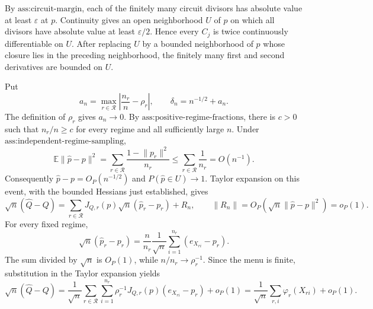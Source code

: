 By \(\text{ass:circuit-margin}\), each of the finitely many circuit divisors has absolute value at least \(\varepsilon\) at \(p\).  Continuity gives an open neighborhood \(U\) of \(p\) on which all divisors have absolute value at least \(\varepsilon/2\).  Hence every \(C_j\) is twice continuously differentiable on \(U\).  After replacing \(U\) by a bounded neighborhood of \(p\) whose closure lies in the preceding neighborhood, the finitely many first and second derivatives are bounded on \(U\).

Put
\[
 a_n=\max_{r\in\mathcal R}\left|\frac{n_r}{n}-\rho_r\right|,
 \qquad \delta_n=n^{-1/2}+a_n.
\]
The definition of \(\rho_r\) gives \(a_n\to0\).  By \(\text{ass:positive-regime-fractions}\), there is \(c>0\) such that \(n_r/n\ge c\) for every regime and all sufficiently large \(n\).  Under \(\text{ass:independent-regime-sampling}\),
\[
 \mathbb E\lVert\widehat p-p\rVert^2
 =\sum_{r\in\mathcal R}\frac{1-\lVert p_r\rVert^2}{n_r}
 \le\sum_{r\in\mathcal R}\frac1{n_r}
 =O(n^{-1}).
\]
Consequently \(\widehat p-p=O_P(n^{-1/2})\) and \(P(\widehat p\in U)\to1\).  Taylor expansion on this event, with the bounded Hessians just established, gives
\[
 \sqrt n(\widehat Q-Q)
 =\sum_{r\in\mathcal R}J_{Q,r}(p)\sqrt n(\widehat p_r-p_r)+R_n,
 \qquad
 \lVert R_n\rVert
 =O_P\!\left(\sqrt n\lVert\widehat p-p\rVert^2\right)
 =o_P(1).
\]
For every fixed regime,
\[
 \sqrt n(\widehat p_r-p_r)
 =\frac{n}{n_r}\frac1{\sqrt n}
   \sum_{i=1}^{n_r}(e_{X_{ri}}-p_r).
\]
The sum divided by \(\sqrt n\) is \(O_P(1)\), while \(n/n_r\to\rho_r^{-1}\).  Since the menu is finite, substitution in the Taylor expansion yields
\[
 \sqrt n(\widehat Q-Q)
 =\frac1{\sqrt n}\sum_{r\in\mathcal R}\sum_{i=1}^{n_r}
   \rho_r^{-1}J_{Q,r}(p)(e_{X_{ri}}-p_r)+o_P(1)
 =\frac1{\sqrt n}\sum_{r,i}\varphi_r(X_{ri})+o_P(1).
\]


